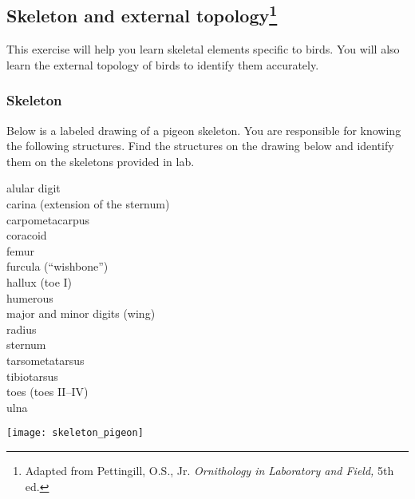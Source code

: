\documentclass[10pt]{article}
\begin{document}
\thispagestyle{plain}

\subsection*{Skeleton and external topology\footnote{Adapted from
		Pettingill, O.S., Jr. \textit{Ornithology in Laboratory and Field,} 
		5th ed.}}

	This exercise will help you learn skeletal elements specific 
	to birds. You will also learn the external topology of birds to 
	identify them accurately. 


\subsubsection*{Skeleton}

	Below is a labeled drawing of a pigeon skeleton. You are 
	responsible for knowing the following structures. Find 
	the structures on the drawing below and identify them 
	on the skeletons provided in lab.

\begin{multicols}{3}
	alular digit\\
	carina (extension of the sternum)\\
	carpometacarpus\\
	coracoid\\
	femur\\
	furcula (“wishbone”)\\
	hallux (toe I)\\
	humerous\\
	major and minor digits (wing)\\
	radius\\
	sternum\\
	tarsometatarsus\\
	tibiotarsus\\
	toes (toes II–IV)\\
	ulna
\end{multicols}


\begin{center}
	\texttt{[image: skeleton\_pigeon]}
\end{center}

\newpage
\end{document}
